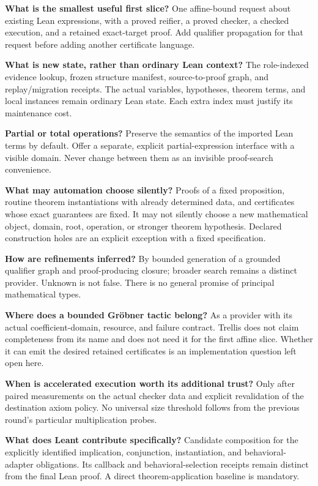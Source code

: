 \documentclass[11pt,a4paper]{article}
\theoremstyle{definition}
\theoremstyle{remark}
\begin{document}
\textbf{What is the smallest useful first slice?} One affine-bound request about existing Lean expressions, with a proved reifier, a proved checker, a checked execution, and a retained exact-target proof. Add qualifier propagation for that request before adding another certificate language.

\textbf{What is new state, rather than ordinary Lean context?} The role-indexed evidence lookup, frozen structure manifest, source-to-proof graph, and replay/migration receipts. The actual variables, hypotheses, theorem terms, and local instances remain ordinary Lean state. Each extra index must justify its maintenance cost.

\textbf{Partial or total operations?} Preserve the semantics of the imported Lean terms by default. Offer a separate, explicit partial-expression interface with a visible domain. Never change between them as an invisible proof-search convenience.

\textbf{What may automation choose silently?} Proofs of a fixed proposition, routine theorem instantiations with already determined data, and certificates whose exact guarantees are fixed. It may not silently choose a new mathematical object, domain, root, operation, or stronger theorem hypothesis. Declared construction holes are an explicit exception with a fixed specification.

\textbf{How are refinements inferred?} By bounded generation of a grounded qualifier graph and proof-producing closure; broader search remains a distinct provider. Unknown is not false. There is no general promise of principal mathematical types.

\textbf{Where does a bounded Gr\"obner tactic belong?} As a provider with its actual coefficient-domain, resource, and failure contract. Trellis does not claim completeness from its name and does not need it for the first affine slice. Whether it can emit the desired retained certificates is an implementation question left open here.

\textbf{When is accelerated execution worth its additional trust?} Only after paired measurements on the actual checker data and explicit revalidation of the destination axiom policy. No universal size threshold follows from the previous round's particular multiplication probes.

\textbf{What does Leant contribute specifically?} Candidate composition for the explicitly identified implication, conjunction, instantiation, and behavioral-adapter obligations. Its callback and behavioral-selection receipts remain distinct from the final Lean proof. A direct theorem-application baseline is mandatory.
\end{document}

